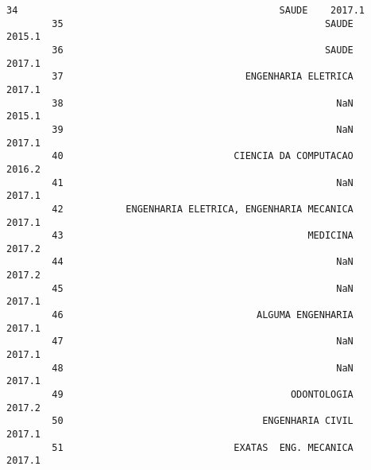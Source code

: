 \documentclass[11pt]{article}
\begin{document}
\begin{Verbatim}[commandchars=\\\{\}]
        34                                              SAUDE    2017.1   
        35                                              SAUDE    2015.1   
        36                                              SAUDE    2017.1   
        37                                ENGENHARIA ELETRICA    2017.1   
        38                                                NaN    2015.1   
        39                                                NaN    2017.1   
        40                              CIENCIA DA COMPUTACAO    2016.2   
        41                                                NaN    2017.1   
        42           ENGENHARIA ELETRICA, ENGENHARIA MECANICA    2017.1   
        43                                           MEDICINA    2017.2   
        44                                                NaN    2017.2   
        45                                                NaN    2017.1   
        46                                  ALGUMA ENGENHARIA    2017.1   
        47                                                NaN    2017.1   
        48                                                NaN    2017.1   
        49                                        ODONTOLOGIA    2017.2   
        50                                   ENGENHARIA CIVIL    2017.1   
        51                              EXATAS  ENG. MECANICA    2017.1   
        

\end{Verbatim}
\end{document}
